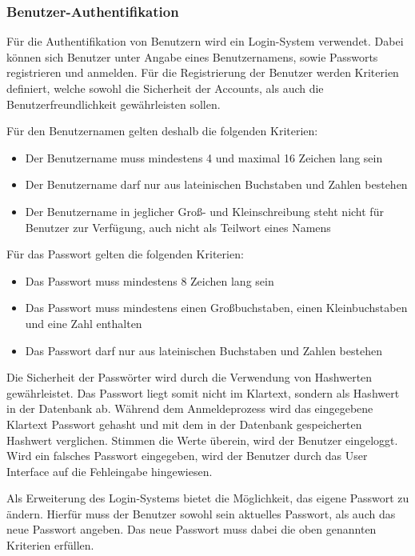 \subsubsection{Benutzer-Authentifikation}\label{sec:BenutzerAuthentifikation}
Für die Authentifikation von Benutzern wird ein Login-System verwendet.
Dabei können sich Benutzer unter Angabe eines Benutzernamens, sowie Passworts registrieren und anmelden.
Für die Registrierung der Benutzer werden Kriterien definiert, welche sowohl die Sicherheit der Accounts, als auch die Benutzerfreundlichkeit gewährleisten sollen.

\noindent{}Für den Benutzernamen gelten deshalb die folgenden Kriterien:
\begin{itemize}
  \item Der Benutzername muss mindestens 4 und maximal 16 Zeichen lang sein
  \item Der Benutzername darf nur aus lateinischen Buchstaben und Zahlen bestehen
  \item Der Benutzername  in jeglicher Groß- und Kleinschreibung steht nicht für Benutzer zur Verfügung, auch nicht als Teilwort eines Namens
\end{itemize}
Für das Passwort gelten die folgenden Kriterien:
\begin{itemize}
  \item Das Passwort muss mindestens 8 Zeichen lang sein
  \item Das Passwort muss mindestens einen Großbuchstaben, einen Kleinbuchstaben und eine Zahl enthalten
  \item Das Passwort darf nur aus lateinischen Buchstaben und Zahlen bestehen
\end{itemize} 

\noindent{}Die Sicherheit der Passwörter wird durch die Verwendung von Hashwerten gewährleistet.
Das Passwort liegt somit nicht im Klartext, sondern als Hashwert in der Datenbank ab.
Während dem Anmeldeprozess wird das eingegebene Klartext Passwort gehasht und mit dem in der Datenbank gespeicherten Hashwert verglichen.
Stimmen die Werte überein, wird der Benutzer eingeloggt.
Wird ein falsches Passwort eingegeben, wird der Benutzer durch das User Interface auf die Fehleingabe hingewiesen.

\noindent{}Als Erweiterung des Login-Systems bietet  die Möglichkeit, das eigene Passwort zu ändern.
Hierfür muss der Benutzer sowohl sein aktuelles Passwort, als auch das neue Passwort angeben.
Das neue Passwort muss dabei die oben genannten Kriterien erfüllen.


